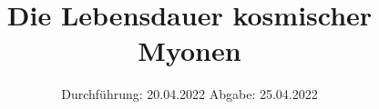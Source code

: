 

\subject{V01}
\title{Die Lebensdauer kosmischer Myonen}
\date{%
  Durchführung: 20.04.2022
  \hspace{3em}
  Abgabe: 25.04.2022
}


\maketitle
\thispagestyle{empty}
\tableofcontents
\newpage
{}






\printbibliography{}



